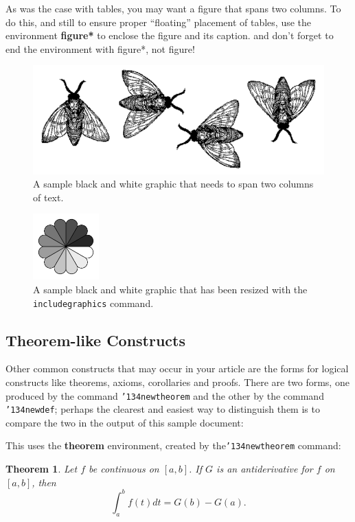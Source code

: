 \documentclass{sig-alternate-05-2015}
\begin{document}
As was the case with tables, you may want a figure
that spans two columns.  To do this, and still to
ensure proper ``floating'' placement of tables, use the environment
\textbf{figure*} to enclose the figure and its caption.
and don't forget to end the environment with
{figure*}, not {figure}!

\begin{figure}
\centering
\includegraphics{flies}
\caption{A sample black and white graphic
that needs to span two columns of text.}
\end{figure}


\begin{figure}
\centering
\includegraphics[height=1in, width=1in]{rosette}
\caption{A sample black and white graphic that has
been resized with the \texttt{includegraphics} command.}
\vskip -6pt
\end{figure}

\subsection{Theorem-like Constructs}
Other common constructs that may occur in your article are
the forms for logical constructs like theorems, axioms,
corollaries and proofs.  There are
two forms, one produced by the
command \texttt{{\char'134}newtheorem} and the
other by the command \texttt{{\char'134}newdef}; perhaps
the clearest and easiest way to distinguish them is
to compare the two in the output of this sample document:

This uses the \textbf{theorem} environment, created by
the\linebreak\texttt{{\char'134}newtheorem} command:
\newtheorem{theorem}{Theorem}
\begin{theorem}
Let $f$ be continuous on $[a,b]$.  If $G$ is
an antiderivative for $f$ on $[a,b]$, then
\begin{displaymath}\int^b_af(t)dt = G(b) - G(a).\end{displaymath}
\end{theorem}
\end{document}
